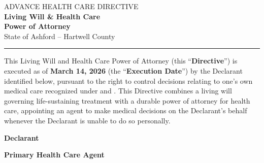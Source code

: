 \thispagestyle{firstpage}

\begin{center}
  {\sffamily\color{willslate}\small ADVANCE HEALTH CARE DIRECTIVE}\\[2pt]
  {\sffamily\bfseries\LARGE\color{willnavy} Living Will \& Health Care\\ Power of Attorney}\\[6pt]
  {\sffamily\large\color{willgold} State of Ashford -- Hartwell County}\\[10pt]
  {\color{willgold}\rule{0.55\linewidth}{1pt}}
\end{center}

\vspace{6pt}

This Living Will and Health Care Power of Attorney (this ``\textbf{Directive}'') is executed as of \textbf{March 14, 2026} (the ``\textbf{Execution Date}'') by the Declarant identified below, pursuant to the right to control decisions relating to one's own medical care recognized under \citet{uhcda1993} and \citet{psda1990}. This Directive combines a living will governing life-sustaining treatment with a durable power of attorney for health care, appointing an agent to make medical decisions on the Declarant's behalf whenever the Declarant is unable to do so personally.

\vspace{4pt}

\noindent
\begin{minipage}[t]{0.48\linewidth}
\begin{infobox}
{\sffamily\bfseries\color{willnavy} Declarant}\\[4pt]
\end{infobox}
\end{minipage}\hfill
\begin{minipage}[t]{0.48\linewidth}
\begin{infobox}
{\sffamily\bfseries\color{willnavy} Primary Health Care Agent}\\[4pt]
\end{infobox}
\end{minipage}
\par

